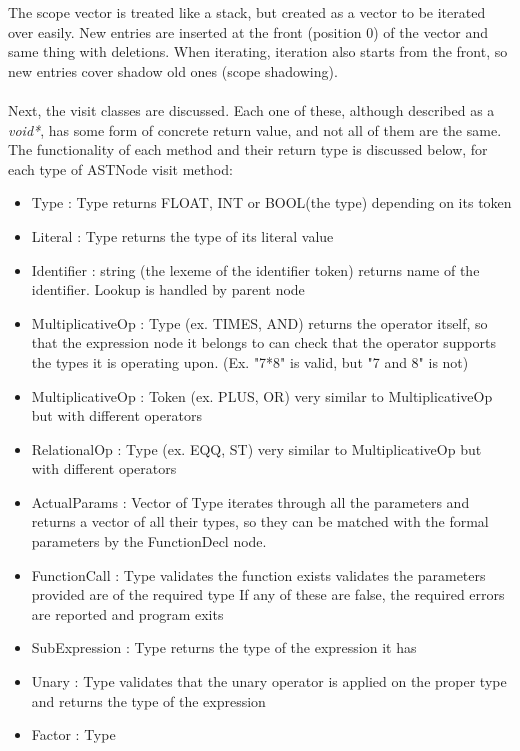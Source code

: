 The scope vector is treated like a stack, but created as a vector to be iterated over easily. New entries are inserted at the front (position 0) of the vector and same thing with deletions. When iterating, iteration also starts from the front, so new entries cover shadow old ones (scope shadowing).
\\\\
Next, the visit classes are discussed. Each one of these, although described as a \textit{void*}, has some form of concrete return value, and not all of them are the same. The functionality of each method and their return type is discussed below, for each type of ASTNode visit method:
\begin{itemize}
	\item Type : Type 
		\subitem returns FLOAT, INT or BOOL(the type) depending on its token
	\item Literal : Type
		\subitem returns the type of its literal value
	\item Identifier : string (the lexeme of the identifier token)
		\subitem returns name of the identifier. Lookup is handled by parent node
	\item MultiplicativeOp : Type (ex. TIMES, AND)
		\subitem returns the operator itself, so that the expression node it belongs to can check that the operator supports the types it is operating upon. (Ex. "7*8" is valid, but "7 and 8" is not)
	\item MultiplicativeOp : Token (ex. PLUS, OR)
		\subitem very similar to MultiplicativeOp but with different operators
	\item RelationalOp : Type (ex. EQQ, ST)
		\subitem very similar to MultiplicativeOp but with different operators
	\item ActualParams : Vector of Type
		\subitem iterates through all the parameters and returns a vector of all their types, so they can be matched with the formal parameters by the FunctionDecl node.
	\item FunctionCall : Type
		\subitem validates the function exists
		\subitem validates the parameters provided are of the required type
		\subitem If any of these are false, the required errors are reported and program exits
	\item SubExpression : Type
		\subitem returns the type of the expression it has
	\item Unary : Type
		\subitem validates that the unary operator is applied on the proper type and returns the type of the expression
	\item Factor : Type

\end{itemize}
